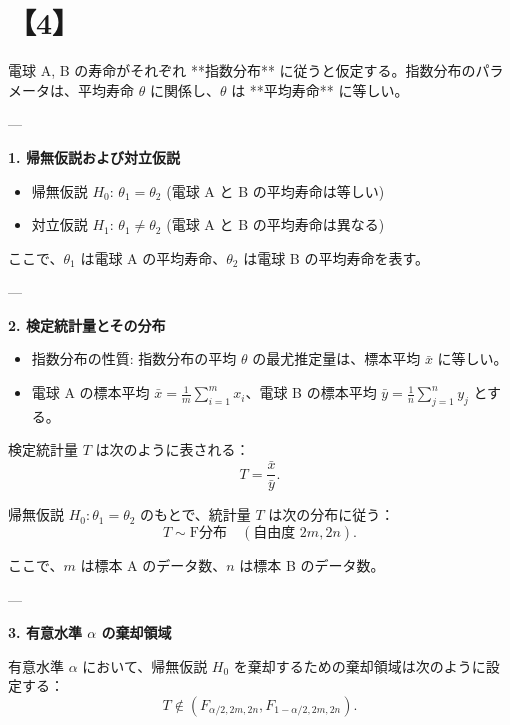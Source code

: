 \documentclass[10pt]{jsarticle}
\begin{document}
\bigskip
\bigskip

\section*{【4】}

電球 A, B の寿命がそれぞれ **指数分布** に従うと仮定する。指数分布のパラメータは、平均寿命 \(\theta\) に関係し、\(\theta\) は **平均寿命** に等しい。

---

{\bf 1. 帰無仮説および対立仮説}

\begin{itemize}
    \item 帰無仮説 \(H_0\): \( \theta_1 = \theta_2 \) \quad (電球 A と B の平均寿命は等しい)
    \item 対立仮説 \(H_1\): \( \theta_1 \neq \theta_2 \) \quad (電球 A と B の平均寿命は異なる)
\end{itemize}

ここで、\(\theta_1\) は電球 A の平均寿命、\(\theta_2\) は電球 B の平均寿命を表す。

---

{\bf 2. 検定統計量とその分布}

\begin{itemize}
    \item 指数分布の性質: 指数分布の平均 \(\theta\) の最尤推定量は、標本平均 \(\bar{x}\) に等しい。
    \item 電球 A の標本平均 \(\bar{x} = \frac{1}{m} \sum_{i=1}^m x_i\)、電球 B の標本平均 \(\bar{y} = \frac{1}{n} \sum_{j=1}^n y_j\) とする。
\end{itemize}

検定統計量 \(T\) は次のように表される：
\[
T = \frac{\bar{x}}{\bar{y}}.
\]

帰無仮説 \(H_0: \theta_1 = \theta_2\) のもとで、統計量 \(T\) は次の分布に従う：
\[
T \sim \text{F分布} \quad (\text{自由度 } 2m, 2n).
\]

ここで、\(m\) は標本 A のデータ数、\(n\) は標本 B のデータ数。

---

{\bf 3. 有意水準 \(\alpha\) の棄却領域}

有意水準 \(\alpha\) において、帰無仮説 \(H_0\) を棄却するための棄却領域は次のように設定する：
\[
T \notin \left( F_{\alpha/2, 2m, 2n}, F_{1-\alpha/2, 2m, 2n} \right).
\]
\end{document}
